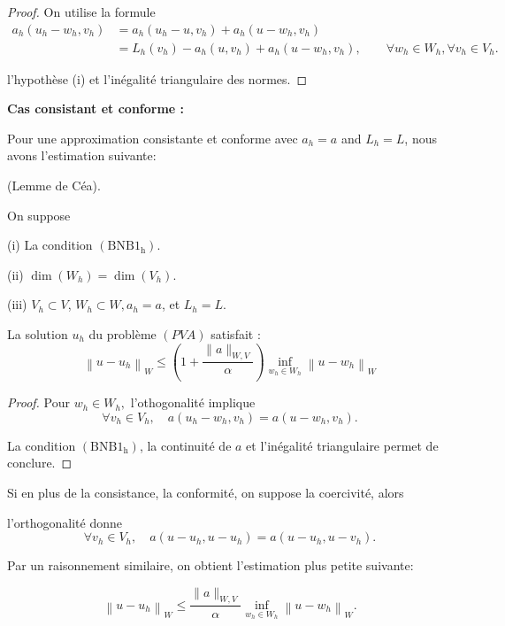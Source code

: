 \begin{proof}
On utilise la formule 
$$
\begin{aligned}
	a_{h}\left(u_{h}-w_{h}, v_{h}\right) &=a_{h}\left(u_{h}-u, v_{h}\right)+a_{h}\left(u-w_{h}, v_{h}\right) \\
	&=L_{h}\left(v_{h}\right)-a_{h}\left(u, v_{h}\right)+a_{h}\left(u-w_{h}, v_{h}\right), \qquad \forall w_{h} \in W_{h},  \forall v_h\in V_h.
\end{aligned}
$$

l'hypothèse (i) et l'inégalité triangulaire des normes.
\end{proof}

{\bf Cas consistant et conforme :}

Pour une approximation  consistante et  conforme avec  $a_{h}=a$ and $L_{h}=L$, nous avons l'estimation suivante:

\begin{proposition}(Lemme de Céa). \
	
	On suppose 
	
	(i)  La condition $\left(\mathrm{BNB} 1_{\mathrm{h}}\right)$.
	
	
	(ii)  $\operatorname{dim}\left(W_{h}\right)=\operatorname{dim}\left(V_{h}\right)$.
	
	 (iii) $V_{h} \subset V$, $W_{h} \subset W, a_{h}=a$,  et  $L_{h}=L.$ 
	 
	 La solution  $u_{h}$ du problème  $(PVA)$ satisfait :
$$
\left\|u-u_{h}\right\|_{W} \leq\left(1+\frac{\|a\|_{W, V}}{\alpha}\right) \inf _{w_{h} \in W_{h}}\left\|u-w_{h}\right\|_{W}
$$

\end{proposition}
\begin{proof}
Pour  $w_{h} \in W_{h},$  l'othogonalité implique 
$$
\forall v_{h} \in V_{h}, \quad a\left(u_{h}-w_{h}, v_{h}\right)=a\left(u-w_{h}, v_{h}\right).
$$

La condition $\left(\mathrm{BNB} 1_{\mathrm{h}}\right)$, la continuité de  $a$ et l'inégalité triangulaire permet de conclure.
\end{proof}

Si en plus de la consistance, la conformité, on suppose la coercivité, alors 

 l'orthogonalité donne
$$
\forall v_{h} \in V_{h}, \quad a\left(u-u_{h}, u-u_{h}\right)=a\left(u-u_{h}, u-v_{h}\right).
$$

Par un raisonnement similaire, on obtient l'estimation plus petite suivante:

$$
\left\|u-u_{h}\right\|_{W} \leq\frac{\|a\|_{W, V}}{\alpha} \inf _{w_{h} \in W_{h}}\left\|u-w_{h}\right\|_{W}.
$$




